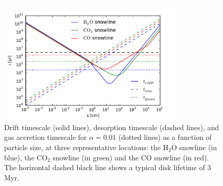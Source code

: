 \documentclass[12pt, preprint]{aastex}
\begin{document}
\begin{figure}[htb]
\centering
\includegraphics[width=0.8\textwidth]{figs/drift_timescales_betaS1_gas_acc.pdf}
\caption{Drift timescale (solid lines), desorption timescale (dashed lines), and gas accretion timescale for $\alpha=0.01$ (dotted lines) as a function of particle size, at three representative locations: the H$_2$O snowline (in blue), the CO$_2$ snowline (in green) and the CO snowline (in red). The horizontal dashed black line shows a typical disk lifetime of 3 Myr.} %
\label{fig:drift_times}
\end{figure}
\end{document}
